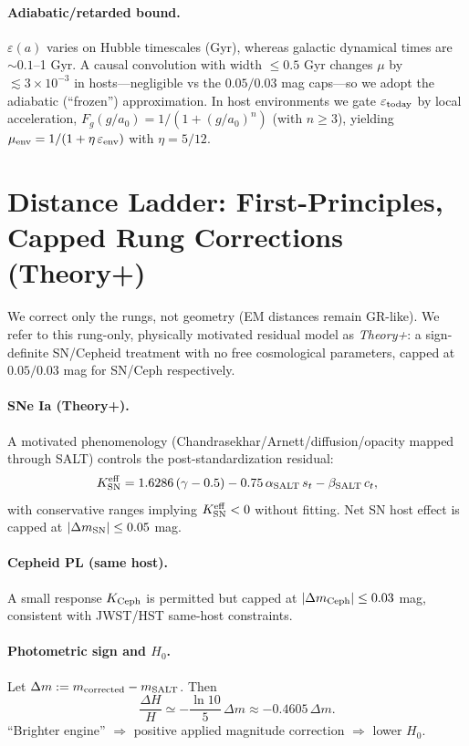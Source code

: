 \documentclass[aps,prd,onecolumn,notitlepage,superscriptaddress,nofootinbib]{revtex4-2}
\newcommand{\Hzero}{H_0}
\newcommand{\eps}{\varepsilon}
\begin{document}
\paragraph*{Adiabatic/retarded bound.}
\(\eps(a)\) varies on Hubble timescales (Gyr), whereas galactic dynamical times are \(\sim 0.1\)--1 Gyr. A causal convolution with width \(\le 0.5\) Gyr changes \(\mu\) by \(\lesssim 3\times 10^{-3}\) in hosts—negligible vs the \(0.05/0.03\) mag caps—so we adopt the adiabatic (``frozen'') approximation. In host environments we gate \(\eps_{\rm today}\) by local acceleration, \(F_g(g/a_0)=1/(1+(g/a_0)^n)\) (with \(n\ge 3\)), yielding \(\mu_{\rm env}=1/(1+\eta\,\eps_{\rm env})\) with \(\eta=5/12\).

\section{Distance Ladder: First-Principles, Capped Rung Corrections (Theory+)}
We correct only the rungs, not geometry (EM distances remain GR-like). We refer to this rung-only, physically motivated residual model as \emph{Theory+}: a sign-definite SN/Cepheid treatment with no free cosmological parameters, capped at \(0.05/0.03\) mag for SN/Ceph respectively.

\paragraph*{SNe Ia (Theory+).}
A motivated phenomenology (Chandrasekhar/Arnett/diffusion/opacity mapped through SALT) controls the post-standardization residual:
\begin{equation}
  K_{\rm SN}^{\rm eff} = 1.6286\,(\gamma-0.5) - 0.75\,\alpha_{\rm SALT}\,s_t - \beta_{\rm SALT}\,c_t,
\end{equation}
with conservative ranges implying \(K_{\rm SN}^{\rm eff}<0\) without fitting. Net SN host effect is capped at \(|\Delta m_{\rm SN}|\le 0.05\) mag.

\paragraph*{Cepheid PL (same host).}
A small response \(K_{\rm Ceph}\) is permitted but capped at \(|\Delta m_{\rm Ceph}|\le 0.03\) mag, consistent with JWST/HST same-host constraints.

\paragraph*{Photometric sign and \(\Hzero\).}
Let \(\Delta m:=m_{\rm corrected}-m_{\rm SALT}\). Then
\begin{equation}
  \frac{\Delta H}{H}\simeq -\frac{\ln 10}{5}\,\Delta m \approx -0.4605\,\Delta m.
\end{equation}
``Brighter engine'' \(\Rightarrow\) positive applied magnitude correction \(\Rightarrow\) lower \(\Hzero\).
\end{document}
